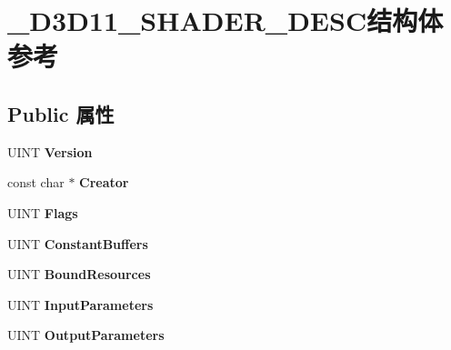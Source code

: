 \hypertarget{struct___d3_d11___s_h_a_d_e_r___d_e_s_c}{}\section{\+\_\+\+D3\+D11\+\_\+\+S\+H\+A\+D\+E\+R\+\_\+\+D\+E\+S\+C结构体 参考}
\label{struct___d3_d11___s_h_a_d_e_r___d_e_s_c}
\subsection*{Public 属性}
\begin{DoxyCompactItemize}
\item 
\mbox{\label{struct___d3_d11___s_h_a_d_e_r___d_e_s_c_a5bc0fceed2294cd7c53a4599af2375a3}} 
U\+I\+NT {\bfseries Version}
\item 
\mbox{\label{struct___d3_d11___s_h_a_d_e_r___d_e_s_c_a328640b9e5fdf06dce2c6484ad35acde}} 
const char $\ast$ {\bfseries Creator}
\item 
\mbox{\label{struct___d3_d11___s_h_a_d_e_r___d_e_s_c_a0857b4194d3c1d5720481496323f7316}} 
U\+I\+NT {\bfseries Flags}
\item 
\mbox{\label{struct___d3_d11___s_h_a_d_e_r___d_e_s_c_a07e13bcc17c3d4416bae1c9bbdd0a287}} 
U\+I\+NT {\bfseries Constant\+Buffers}
\item 
\mbox{\label{struct___d3_d11___s_h_a_d_e_r___d_e_s_c_a0f8b29df0001a7b3cd076d4f8be9786c}} 
U\+I\+NT {\bfseries Bound\+Resources}
\item 
\mbox{\label{struct___d3_d11___s_h_a_d_e_r___d_e_s_c_a1597f75448eaff0a2ba526eb59968af3}} 
U\+I\+NT {\bfseries Input\+Parameters}
\item 
\mbox{\label{struct___d3_d11___s_h_a_d_e_r___d_e_s_c_af586c42776064a3a30bb5799b2baa33d}} 
U\+I\+NT {\bfseries Output\+Parameters}
\item 
\mbox{\label{struct___d3_d11___s_h_a_d_e_r___d_e_s_c_a012a05a93f60f3ee4ac58c70932fdd8f}} 

\end{DoxyCompactItemize}
